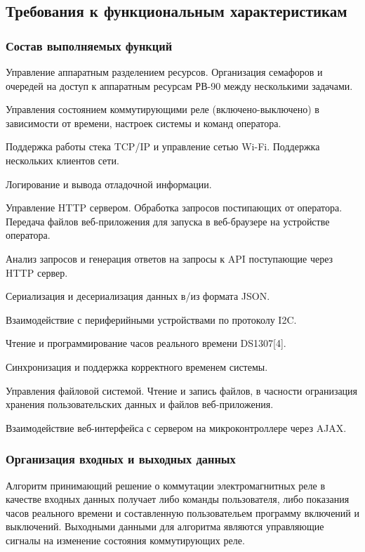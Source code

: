 

\subsection{Требования к функциональным характеристикам}
\subsubsection{Состав выполняемых функций}

\begin{my_enumerate}
\item Управление аппаратным разделением ресурсов. Организация семафоров и очередей на доступ к аппаратным ресурсам РВ-90 между несколькими задачами.
\item Управления состоянием коммутирующими реле (включено-выключено) в зависимости от времени, настроек системы и команд оператора.
\item Поддержка работы стека TCP/IP и управление сетью Wi-Fi. Поддержка нескольких клиентов сети.
\item Логирование и вывода отладочной информации.
\item Управление HTTP сервером. Обработка запросов постипающих от оператора. Передача файлов веб-приложения для запуска в веб-браузере на устройстве оператора. 
\item Анализ запросов и генерация ответов на запросы к API поступающие через HTTP сервер.
\item Сериализация и десериализация данных в/из формата JSON.
\item Взаимодействие с периферийными устройствами по протоколу I2C.
\item Чтение и программирование часов реального времени DS1307[4].
\item Синхронизация и поддержка корректного временем системы.
\item Управления файловой системой. Чтение и запись файлов, в часности огранизация хранения пользовательских данных и файлов веб-приложения.
\item Взаимодействие веб-интерфейса с сервером на микроконтроллере через AJAX.
\end{my_enumerate}

\subsubsection{Организация входных и выходных данных}
Алгоритм принимающий решение о коммутации электромагнитных реле в качестве входных данных получает либо команды пользователя, либо показания часов реального времени и составленную пользовательем программу включений и выключений. Выходными данными для алгоритма являются управляющие сигналы на изменение состояния коммутирующих реле. 


